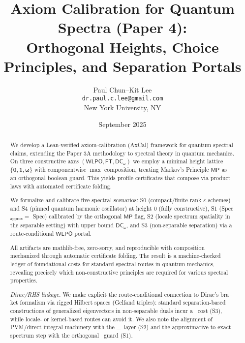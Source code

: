 \documentclass[11pt]{article}
\title{Axiom Calibration for Quantum Spectra (Paper 4):\\
Orthogonal Heights, Choice Principles, and Separation Portals}
\author{Paul Chun--Kit Lee\\
\texttt{dr.paul.c.lee@gmail.com}\\
New York University, NY}
\date{September 2025}
\newcommand{\WLPO}{\mathsf{WLPO}}
\newcommand{\FT}{\mathsf{FT}}
\newcommand{\DCw}{\mathsf{DC}_{\omega}}
\newcommand{\MP}{\mathsf{MP}}
\newcommand{\hzero}{\mathbf{0}}
\newcommand{\hone}{\mathbf{1}}
\newcommand{\homega}{\boldsymbol{\omega}}
\theoremstyle{plain}
\theoremstyle{definition}
\theoremstyle{remark}
\begin{document}
\maketitle

\begin{abstract}
We develop a Lean-verified axiom-calibration (AxCal) framework for quantum spectral claims, extending the Paper 3A methodology to spectral theory in quantum mechanics.
On three constructive axes \((\WLPO,\FT,\DCw)\) we employ a minimal height lattice
\(\{\hzero,\hone,\homega\}\) with componentwise \(\max\) composition, treating Markov's Principle \(\MP\) as an
orthogonal boolean guard. This yields profile certificates that compose via product
laws with automated certificate folding. 

We formalize and calibrate five spectral scenarios:
S0 (compact/finite-rank \(\varepsilon\)-schemes) and S4 (pinned quantum harmonic oscillator) at height \(0\) (fully constructive),
S1 (Spec\(_{\mathrm{approx}}=\) Spec) calibrated by the orthogonal \(\MP\) flag, 
S2 (locale spectrum spatiality in the separable setting) with upper bound \(\DCw\), 
and S3 (non-separable separation) via a route-conditional \(\WLPO\) portal. 

All artifacts are mathlib-free, zero-sorry, and reproducible with composition mechanized through automatic certificate folding. The result
is a machine-checked ledger of foundational costs for standard spectral routes in quantum mechanics,
revealing precisely which non-constructive principles are required for various spectral properties.

\medskip
\noindent\emph{Dirac/RHS linkage.} We make explicit the route-conditional connection to Dirac's bra--ket formalism via rigged Hilbert spaces (Gelfand triples): standard separation-based constructions of generalized eigenvectors in non-separable duals incur a \WLPO\ cost (S3), while locale- or kernel-based routes can avoid it. We also note the alignment of PVM/direct-integral machinery with the \DCw\ layer (S2) and the approximative-to-exact spectrum step with the orthogonal \MP\ guard (S1).
\end{abstract}

\end{document}
